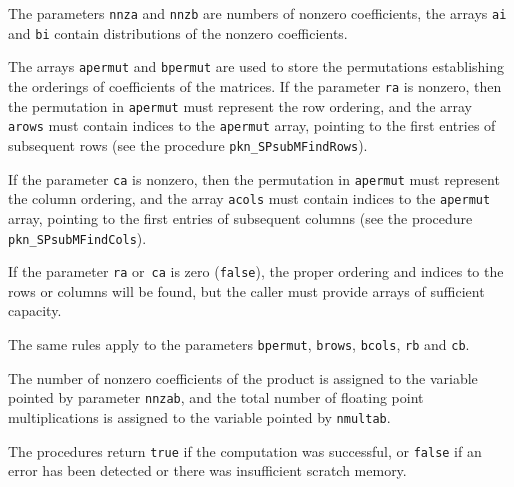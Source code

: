 The parameters \texttt{nnza} and \texttt{nnzb} are numbers of nonzero
coefficients, the arrays \texttt{ai} and \texttt{bi} contain distributions of
the nonzero coefficients.

The arrays \texttt{apermut} and \texttt{bpermut} are used to store the
permutations establishing the orderings of coefficients of the matrices.
If the parameter \texttt{ra} is nonzero, then the permutation in
\texttt{apermut} must represent the row ordering, and the array
\texttt{arows} must contain indices to the \texttt{apermut} array, pointing
to the first entries of subsequent rows (see the procedure
\texttt{pkn\_SPsubMFindRows}).

If the parameter \texttt{ca} is nonzero, then the permutation in
\texttt{apermut} must represent the column ordering, and the array
\texttt{acols} must contain indices to the \texttt{apermut} array, pointing
to the first entries of subsequent columns (see the procedure
\texttt{pkn\_SPsubMFindCols}).

If the parameter \texttt{ra} or~\texttt{ca} is zero (\texttt{false}), the
proper ordering and indices to the rows or columns will be found, but the
caller must provide arrays of sufficient capacity.

The same rules apply to the parameters \texttt{bpermut}, \texttt{brows},
\texttt{bcols}, \texttt{rb} and \texttt{cb}.

The number of nonzero coefficients of the product is assigned to the
variable pointed by parameter \texttt{nnzab}, and the total number of
floating point multiplications is assigned to the variable pointed by
\texttt{nmultab}.

The procedures return \texttt{true} if the computation was successful, or
\texttt{false} if an error has been detected or there was insufficient
scratch memory.

